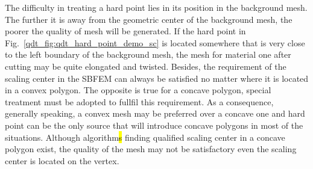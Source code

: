 The difficulty in treating a hard point lies in its position in the background mesh.
The further it is away from the geometric center of the background mesh, the poorer the quality of mesh will be generated.
If the hard point in Fig.~\ref{qdt_fig:qdt_hard_point_demo_sc} is located somewhere that is very close to the left boundary of the background mesh, the mesh for material one after cutting may be quite elongated and twisted.
Besides, the requirement of the scaling center in the SBFEM can always be satisfied no matter where it is located in a convex polygon.
The opposite is true for a concave polygon, special treatment must be adopted to fullfil this requirement.
As a consequence, generally speaking, a convex mesh may be preferred over a concave one and hard point can be the only source that will introduce concave polygons in most of the situations.
Although algorithm\hl{s} finding qualified scaling center in a concave polygon exist, the quality of the mesh may not be satisfactory even the scaling center is located on the vertex.


